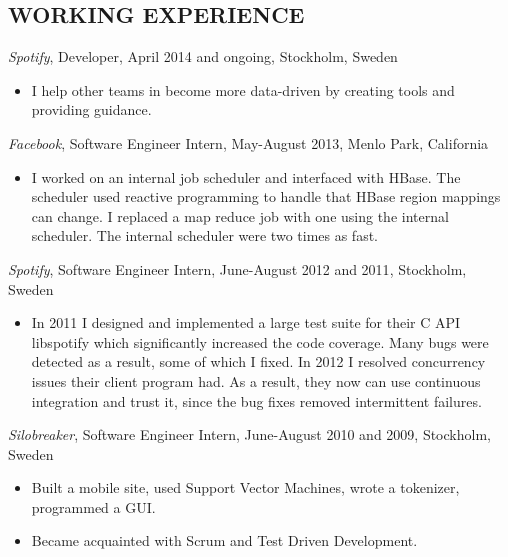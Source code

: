 \documentclass[11pt]{res} %
\begin{document}
\begin{resume}
\section{WORKING EXPERIENCE}
\emph{Spotify}, {\footnotesize Developer, April 2014 and ongoing}, Stockholm, Sweden
\vspace{0.2in}
   \begin{itemize}
   \item I help other teams in become more data-driven by creating tools and
     providing guidance.
 \end{itemize}

\emph{Facebook}, {\footnotesize Software Engineer Intern, May-August 2013}, Menlo Park, California
\vspace{0.2in}
   \begin{itemize}
   \item I worked on an internal job scheduler and interfaced with HBase. The
     scheduler used reactive programming to handle that HBase region mappings
     can change. I replaced a map reduce job with one using the internal
     scheduler. The internal scheduler were two times as fast.
 \end{itemize}

 \emph{Spotify}, {\footnotesize Software Engineer Intern, June-August 2012 and 2011}, Stockholm, Sweden
\vspace{0.2in}
   \begin{itemize} %
   \item In 2011 I designed and implemented a large test suite for their C API
     libspotify which significantly increased the code coverage. Many bugs were
     detected as a result, some of which I fixed. In 2012 I resolved
     concurrency issues their client program had. As a result, they now can use
     continuous integration and trust it, since the bug fixes removed
     intermittent failures.

 \end{itemize}


 \emph{Silobreaker}, {\footnotesize Software Engineer Intern, June-August 2010 and 2009}, Stockholm, Sweden
\vspace{0.2in}
 \begin{itemize} %
  \item Built a mobile site, used Support Vector Machines, wrote a tokenizer,
   programmed a GUI.
  \item Became acquainted with Scrum and Test Driven Development.
\end{itemize}


\end{resume}
\end{document}
